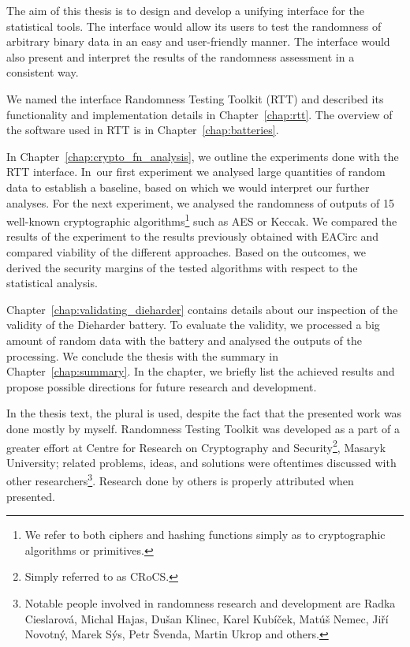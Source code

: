 \documentclass[
	digital,    %
	oneside,
	color,
	11pt,
	nocover,
	notable,
	nolof,
	nolot,
]{fithesis3}
\theoremstyle{definition}
\theoremstyle{remark}
\begin{document}
The aim of this thesis is to design and develop a unifying interface for the statistical tools. The interface would allow its users to test the randomness of arbitrary binary data in an easy and user-friendly manner. The interface would also present and interpret the results of the randomness assessment in a consistent way. 

We named the interface Randomness Testing Toolkit (RTT) \cite{rtt-github} and described its functionality and implementation details in Chapter~\ref{chap:rtt}. The overview of the software used in RTT is in Chapter~\ref{chap:batteries}. 

In Chapter~\ref{chap:crypto_fn_analysis}, we outline the experiments done with the RTT interface. In~our first experiment we analysed large quantities of random data to establish a baseline, based on which we would interpret our further analyses. For the next experiment, we analysed the randomness of outputs of 15 well-known cryptographic algorithms\footnote{We refer to both ciphers and hashing functions simply as to cryptographic algorithms or primitives.} such as AES or Keccak. We compared the results of the experiment to the results previously obtained with EACirc and compared viability of the different approaches. Based on the outcomes, we derived the security margins of the tested algorithms with respect to the statistical analysis.

Chapter~\ref{chap:validating_dieharder} contains details about our inspection of the validity of the Dieharder battery. To evaluate the validity, we processed a big amount of random data with the battery and analysed the outputs of the processing. We conclude the thesis with the summary in Chapter~\ref{chap:summary}. In the chapter, we briefly list the achieved results and propose possible directions for future research and development.

In the thesis text, the plural is used, despite the fact that the presented work was done mostly by myself. Randomness Testing Toolkit was developed as a part of a greater effort at Centre for Research on Cryptography and Security\footnote{Simply referred to as CRoCS.}, Masaryk University; related problems, ideas, and solutions were oftentimes discussed with other researchers\footnote{Notable people involved in randomness research and development are Radka Cieslarová, Michal Hajas, Dušan Klinec, Karel Kubíček, Matúš Nemec, Jiří Novotný, Marek Sýs, Petr Švenda, Martin Ukrop and others.}. Research done by others is properly attributed when presented.
\end{document}
